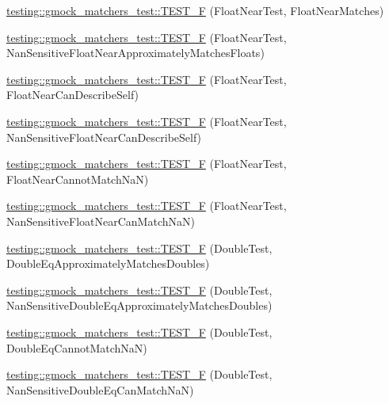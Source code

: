 \begin{DoxyCompactItemize}
\item 
\hyperlink{namespacetesting_1_1gmock__matchers__test_a6897409da5003f20f891d8a5ecabdc99}{testing\+::gmock\+\_\+matchers\+\_\+test\+::\+T\+E\+S\+T\+\_\+F} (Float\+Near\+Test, Float\+Near\+Matches)
\item 
\hyperlink{namespacetesting_1_1gmock__matchers__test_ad396e996ed685fd80cbd78740b8d01a8}{testing\+::gmock\+\_\+matchers\+\_\+test\+::\+T\+E\+S\+T\+\_\+F} (Float\+Near\+Test, Nan\+Sensitive\+Float\+Near\+Approximately\+Matches\+Floats)
\item 
\hyperlink{namespacetesting_1_1gmock__matchers__test_ad56232046efe7b4d5169a15fd15a2001}{testing\+::gmock\+\_\+matchers\+\_\+test\+::\+T\+E\+S\+T\+\_\+F} (Float\+Near\+Test, Float\+Near\+Can\+Describe\+Self)
\item 
\hyperlink{namespacetesting_1_1gmock__matchers__test_a4e90d53ea578d6b767559d8615a4c0c2}{testing\+::gmock\+\_\+matchers\+\_\+test\+::\+T\+E\+S\+T\+\_\+F} (Float\+Near\+Test, Nan\+Sensitive\+Float\+Near\+Can\+Describe\+Self)
\item 
\hyperlink{namespacetesting_1_1gmock__matchers__test_a2cd2ceebefa14a5d564a3bca60ed6572}{testing\+::gmock\+\_\+matchers\+\_\+test\+::\+T\+E\+S\+T\+\_\+F} (Float\+Near\+Test, Float\+Near\+Cannot\+Match\+NaN)
\item 
\hyperlink{namespacetesting_1_1gmock__matchers__test_ae7521865828fba53b45cc2819bec1273}{testing\+::gmock\+\_\+matchers\+\_\+test\+::\+T\+E\+S\+T\+\_\+F} (Float\+Near\+Test, Nan\+Sensitive\+Float\+Near\+Can\+Match\+NaN)
\item 
\hyperlink{namespacetesting_1_1gmock__matchers__test_a1b33dc485faca8c69184f3feb0476290}{testing\+::gmock\+\_\+matchers\+\_\+test\+::\+T\+E\+S\+T\+\_\+F} (Double\+Test, Double\+Eq\+Approximately\+Matches\+Doubles)
\item 
\hyperlink{namespacetesting_1_1gmock__matchers__test_ab100ee4a4b0340e31212fb43c9e28255}{testing\+::gmock\+\_\+matchers\+\_\+test\+::\+T\+E\+S\+T\+\_\+F} (Double\+Test, Nan\+Sensitive\+Double\+Eq\+Approximately\+Matches\+Doubles)
\item 
\hyperlink{namespacetesting_1_1gmock__matchers__test_a4c34f3f339de72d3f4f96a08a5125b59}{testing\+::gmock\+\_\+matchers\+\_\+test\+::\+T\+E\+S\+T\+\_\+F} (Double\+Test, Double\+Eq\+Cannot\+Match\+NaN)
\item 
\hyperlink{namespacetesting_1_1gmock__matchers__test_ab42c199ae0008ce7550f584742caec28}{testing\+::gmock\+\_\+matchers\+\_\+test\+::\+T\+E\+S\+T\+\_\+F} (Double\+Test, Nan\+Sensitive\+Double\+Eq\+Can\+Match\+NaN)

\end{DoxyCompactItemize}
